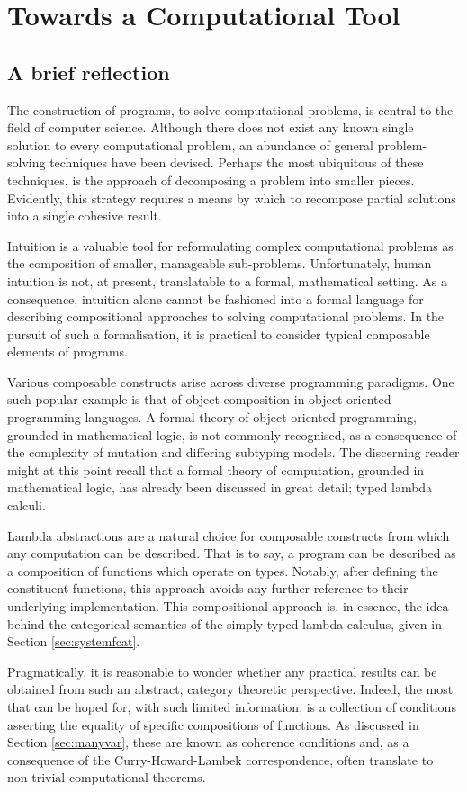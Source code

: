 \documentclass[../Dissertation.tex]{subfiles}
\begin{document}
\section{Towards a Computational Tool}
\subsection{A brief reflection}
The construction of programs, to solve computational problems, is central to the field of computer science. Although there does not exist any known single solution to every computational problem, an abundance of general problem-solving techniques have been devised. Perhaps the most ubiquitous of these techniques, is the approach of decomposing a problem into smaller pieces. Evidently, this strategy requires a means by which to recompose partial solutions into a single cohesive result.
\par
Intuition is a valuable tool for reformulating complex computational problems as the composition of smaller, manageable sub-problems. Unfortunately, human intuition is not, at present, translatable to a formal, mathematical setting. As a consequence, intuition alone cannot be fashioned into a formal language for describing compositional approaches to solving computational problems. In the pursuit of such a formalisation, it is practical to consider typical composable elements of programs.
\par
Various composable constructs arise across diverse programming paradigms. One such popular example is that of object composition in object-oriented programming languages. A formal theory of object-oriented programming, grounded in mathematical logic, is not commonly recognised, as a consequence of the complexity of mutation and differing subtyping models. The discerning reader might at this point recall that a formal theory of computation, grounded in mathematical logic, has already been discussed in great detail; typed lambda calculi.
\par
Lambda abstractions are a natural choice for composable constructs from which any computation can be described. That is to say, a program can be described as a composition of functions which operate on types. Notably, after defining the constituent functions, this approach avoids any further reference to their underlying implementation. This compositional approach is, in essence, the idea behind the categorical semantics of the simply typed lambda calculus, given in  Section \ref{sec:systemfcat}.
\par
Pragmatically, it is reasonable to wonder whether any practical results can be obtained from such an abstract, category theoretic perspective. Indeed, the most that can be hoped for, with such limited information, is a collection of conditions asserting the equality of specific compositions of functions. As discussed in Section \ref{sec:manyvar}, these are known as coherence conditions and, as a consequence of the Curry-Howard-Lambek correspondence, often translate to non-trivial computational theorems. 
\end{document}
